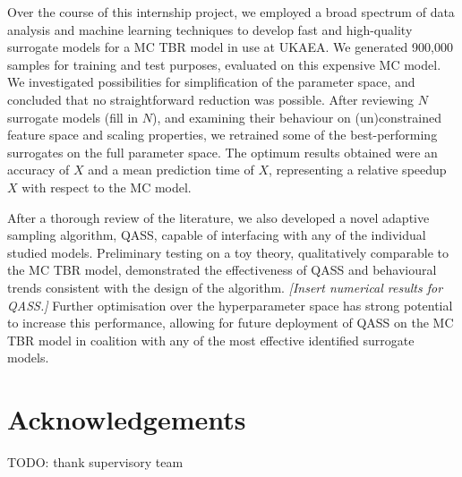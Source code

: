 Over the course of this internship project, we employed a broad spectrum of data analysis and machine learning techniques to develop fast and high-quality surrogate models for a MC TBR model in use at UKAEA. We generated 900,000 samples for training and test purposes, evaluated on this expensive MC model. We investigated possibilities for simplification of the parameter space, and concluded that no straightforward reduction was possible. After reviewing $N$ surrogate models (fill in $N$), and examining their behaviour on (un)constrained feature space and scaling properties, we retrained some of the best-performing surrogates on the full parameter space. The optimum results obtained were an accuracy of $X$ and a mean prediction time of $X$, representing a relative speedup $X$ with respect to the MC model.

After a thorough review of the literature, we also developed a novel adaptive sampling algorithm, QASS, capable of interfacing with any of the individual studied models. Preliminary testing on a toy theory, qualitatively comparable to the MC TBR model, demonstrated the effectiveness of QASS and behavioural trends consistent with the design of the algorithm. \textit{[Insert numerical results for QASS.]} Further optimisation over the hyperparameter space has strong potential to increase this performance, allowing for future deployment of QASS on the MC TBR model in coalition with any of the most effective identified surrogate models.

\section*{Acknowledgements}

TODO: thank supervisory team

\newpage
